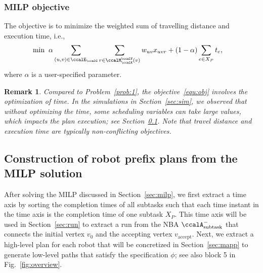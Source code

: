 \documentclass[Afour,sageh,times]{sagej}
\newtheorem{rem}[thm]{Remark}
\newcommand{\auto}[1]{\ccalA_{\textup{#1}}}
\begin{document}
{{\subsubsection{MILP objective}The objective is to minimize the weighted sum of travelling distance and execution time, i.e.,
\begingroup\makeatletter\def\f@size{10}\check@mathfonts
\def\maketag@@@#1{\hbox{\m@th\normalsize\normalfont#1}}%
\begin{align}\label{equ:obj}
  \min \; \;&  \alpha \sum_{(u,v)\in \ccalE_\ccalG}  \sum_{r \in \ccalM^\ccalV_{\ccalK}(v)} w_{uv} x_{uvr} +  (1 - \alpha) \sum_{e\in X_P} t_e,
\end{align}
 \endgroup
  where $\alpha$ is a user-specified parameter.
  \begin{rem}
   Compared to Problem~\ref{prob:1}, the objective~\eqref{equ:obj} involves the optimization of time. In the simulations in Section~\ref{sec:sim}, we observed that without optimizing the time, some scheduling variables can take large values, which impacts the plan execution; see Section~\ref{sec:path}. Note that travel distance and execution time are typically non-conflicting objectives.

  \end{rem}
\subsection{Construction of robot prefix plans from the MILP solution}\label{sec:path}
After solving the MILP discussed in Section~\ref{sec:milp}, we first extract a time axis by sorting the completion times of all subtasks such that each time instant in the time axis is the completion time of one subtask $X_P$. This time axis  will be used in Section~\ref{sec:run} to extract a run from the NBA $\auto{subtask}^-$ that connects the initial vertex $v_0$ and the accepting vertex $v_\text{accept}$. Next, we extract a high-level plan for each robot  that will be concretized in Section~\ref{sec:mapp} to generate low-level paths that satisfy the specification $\phi$; see also block 5 in Fig.~\ref{fig:overview}.


}}
\end{document}
